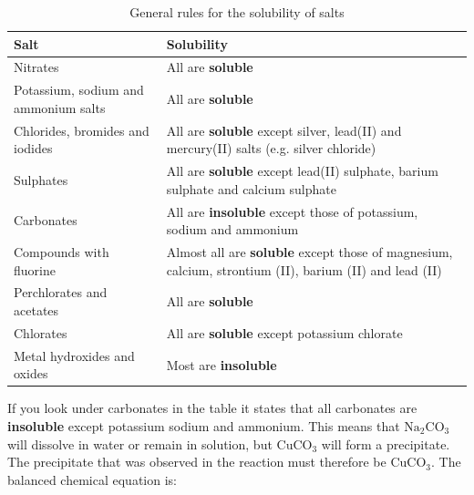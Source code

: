          \begin{table}[H]
        \begin{center}
      \label{m38719*uid69}
    \noindent
      \begin{tabular}{|l|p{8cm}|}\hline
                \textbf{Salt}
               &
                \textbf{Solubility} \\ \hline
        Nitrates &
        All are \textbf{soluble} \\ \hline
        Potassium, sodium and ammonium salts &
        All are \textbf{soluble} \\ \hline
        Chlorides, bromides and iodides &
        All are \textbf{soluble} except silver, lead(II) and mercury(II) salts (e.g. silver chloride) \\ \hline
        Sulphates &
        All are \textbf{soluble} except lead(II) sulphate, barium sulphate and calcium sulphate \\ \hline
        Carbonates &
        All are \textbf{insoluble} except those of potassium, sodium and ammonium \\ \hline
        Compounds with fluorine &
        Almost all are \textbf{soluble} except those of magnesium, calcium, strontium (II), barium (II) and lead (II) \\ \hline
        Perchlorates and acetates &
        All are \textbf{soluble} \\ \hline
        Chlorates &
        All are \textbf{soluble} except potassium chlorate \\ \hline
        Metal hydroxides and oxides &
        Most are \textbf{insoluble} \\ \hline
    \end{tabular}
      \end{center}
    \caption{General rules for the solubility of salts}
\label{tab:solubility}
\end{table}
 \pagebreak
If you look under carbonates in the table it states that all carbonates are \textbf{insoluble} except potassium sodium and ammonium. This means that $\text{Na}_{2}\text{CO}_3$ will dissolve in water or remain in solution, but $\text{CuCO}_3$ will form a precipitate. The precipitate that was observed in the reaction must therefore be $\text{CuCO}_3$. The balanced chemical equation is:\\
